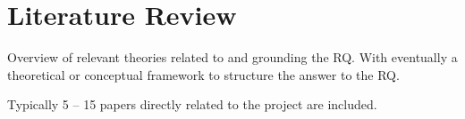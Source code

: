 \chapter{Literature Review}

Overview of relevant theories related to and
grounding the RQ. With eventually a
theoretical or conceptual
framework to structure the answer to the RQ.

Typically 5 – 15 papers
directly related to the project
are included.